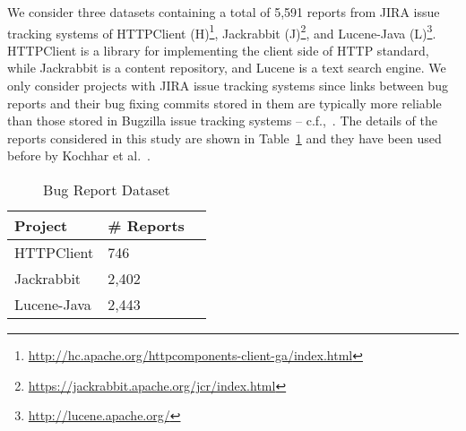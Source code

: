 We consider three datasets containing a total of 5,591 reports from JIRA issue tracking systems of HTTPClient (H)\footnote{\url{http://hc.apache.org/httpcomponents-client-ga/index.html}}, Jackrabbit (J)\footnote{\url{https://jackrabbit.apache.org/jcr/index.html}}, and Lucene-Java (L)\footnote{\url{ http://lucene.apache.org/}}. HTTPClient is a library for implementing the client side of HTTP standard, while Jackrabbit is a content repository, and Lucene is a text search engine. We only consider projects with JIRA issue tracking systems since links between bug reports and their bug fixing commits stored in them are typically more reliable than those stored in Bugzilla issue tracking systems -- c.f.,~\cite{BissyandeTWLJR13}. The details of the reports considered in this study are shown in Table~\ref{tab:reports} and they have been used before by Kochhar et al.~\cite{KochharTL14}. 

\begin{table}
\caption{Bug Report Dataset}\label{tab:reports}
\begin{tabular}{|l|l|l}
\hline
{\bf Project} & {\bf \# Reports} \\
\hline HTTPClient & 746\\
\hline Jackrabbit & 2,402\\
\hline Lucene-Java & 2,443\\
\hline
\end{tabular}
\end{table}



